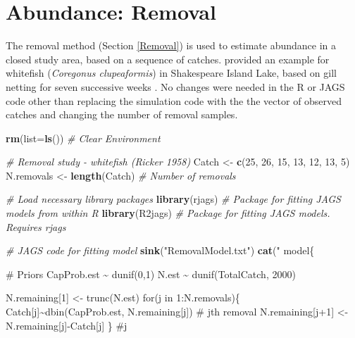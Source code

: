 \documentclass[
]{krantz}
\makeatletter
\newenvironment{Shaded}{\begin{snugshade}}{\end{snugshade}}
\newcommand{\AttributeTok}[1]{\textcolor[rgb]{0.27,0.27,0.27}{#1}}
\newcommand{\CommentTok}[1]{\textcolor[rgb]{0.37,0.37,0.37}{\textit{#1}}}
\newcommand{\DecValTok}[1]{\textcolor[rgb]{0.06,0.06,0.06}{#1}}
\newcommand{\FunctionTok}[1]{\textcolor[rgb]{0.27,0.27,0.27}{\textbf{#1}}}
\newcommand{\NormalTok}[1]{#1}
\newcommand{\OtherTok}[1]{\textcolor[rgb]{0.37,0.37,0.37}{#1}}
\newcommand{\StringTok}[1]{\textcolor[rgb]{0.5,0.5,0.5}{#1}}
\newenvironment{kframe}{%
\medskip{}
\setlength{\fboxsep}{.8em}
 \def\at@end@of@kframe{}%
 \ifinner\ifhmode%
  \def\at@end@of@kframe{\end{minipage}}%
  \begin{minipage}{\columnwidth}%
 \fi\fi%
 \def\FrameCommand##1{\hskip\@totalleftmargin \hskip-\fboxsep
 \colorbox{shadecolor}{##1}\hskip-\fboxsep
     \hskip-\linewidth \hskip-\@totalleftmargin \hskip\columnwidth}%
 \MakeFramed {\advance\hsize-\width
   \@totalleftmargin\z@ \linewidth\hsize
   \@setminipage}}%
 {\par\unskip\endMakeFramed%
 \at@end@of@kframe}
\renewenvironment{Shaded}{\begin{kframe}}{\end{kframe}}
\makeatother
\begin{document}
\hypertarget{RemovalRealData}{%
\section{Abundance: Removal}\label{RemovalRealData}}

The removal method (Section \ref{Removal}) is used to estimate abundance in a closed study area, based on a sequence of catches. \citet{otis.etal_1978} provided an example for whitefish (\emph{Coregonus clupeaformis}) in Shakespeare Island Lake, based on gill netting for seven successive weeks \citep[original data from][]{ricker_1958}. No changes were needed in the R or JAGS code other than replacing the simulation code with the the vector of observed catches and changing the number of removal samples.

\begin{Shaded}
\begin{Highlighting}[]
\FunctionTok{rm}\NormalTok{(}\AttributeTok{list=}\FunctionTok{ls}\NormalTok{()) }\CommentTok{\# Clear Environment}

\CommentTok{\# Removal study {-} whitefish (Ricker 1958)}
\NormalTok{Catch }\OtherTok{\textless{}{-}} \FunctionTok{c}\NormalTok{(}\DecValTok{25}\NormalTok{, }\DecValTok{26}\NormalTok{, }\DecValTok{15}\NormalTok{, }\DecValTok{13}\NormalTok{, }\DecValTok{12}\NormalTok{, }\DecValTok{13}\NormalTok{, }\DecValTok{5}\NormalTok{)}
\NormalTok{N.removals }\OtherTok{\textless{}{-}} \FunctionTok{length}\NormalTok{(Catch) }\CommentTok{\# Number of removals}

\CommentTok{\# Load necessary library packages}
\FunctionTok{library}\NormalTok{(rjags)   }\CommentTok{\# Package for fitting JAGS models from within R}
\FunctionTok{library}\NormalTok{(R2jags)  }\CommentTok{\# Package for fitting JAGS models. Requires rjags}

\CommentTok{\# JAGS code for fitting model}
\FunctionTok{sink}\NormalTok{(}\StringTok{"RemovalModel.txt"}\NormalTok{)}
\FunctionTok{cat}\NormalTok{(}\StringTok{"}
\StringTok{model\{}

\StringTok{\# Priors}
\StringTok{ CapProb.est \textasciitilde{} dunif(0,1)}
\StringTok{ N.est \textasciitilde{} dunif(TotalCatch, 2000)}

\StringTok{ N.remaining[1] \textless{}{-} trunc(N.est)}
\StringTok{ for(j in 1:N.removals)\{}
\StringTok{      Catch[j]\textasciitilde{}dbin(CapProb.est, N.remaining[j]) \# jth removal}
\StringTok{      N.remaining[j+1] \textless{}{-} N.remaining[j]{-}Catch[j]}
\StringTok{  \} \#j}


\end{Highlighting}
\end{Shaded}
\end{document}
